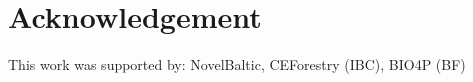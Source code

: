 \documentclass[a4paper,fleqn]{cas-dc}
\begin{document}
\section*{Acknowledgement} 
This work was supported by: NovelBaltic, CEForestry (IBC), BIO4P (BF)

%



%

\newpage
\end{document}
